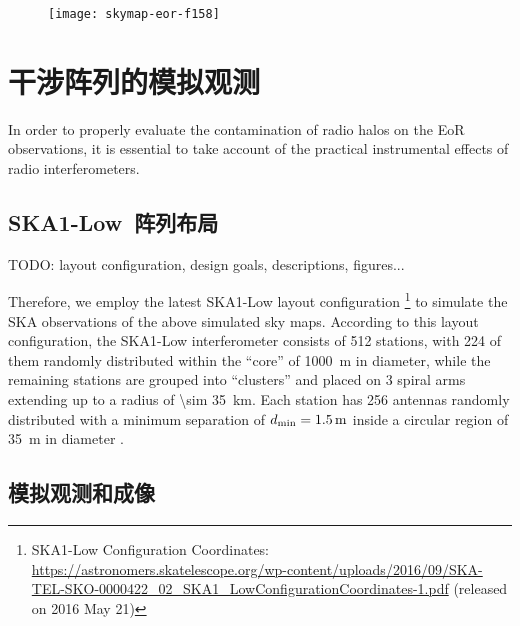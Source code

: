 \begin{figure}[htp]
  \centering
  \texttt{[image: skymap-eor-f158]}
  \label{fig:eor-skymap}
\end{figure}


\section{干涉阵列的模拟观测}
\label{sec:obs-simu}

In order to properly evaluate the contamination of radio halos
on the EoR observations, it is essential to take account of the
practical instrumental effects of radio interferometers.

\subsection{SKA1-Low~阵列布局}

TODO: layout configuration, design goals, descriptions, figures...

Therefore, we employ the latest SKA1-Low layout configuration%
\footnote{\raggedright%
  SKA1-Low Configuration Coordinates:
  \url{https://astronomers.skatelescope.org/wp-content/uploads/2016/09/SKA-TEL-SKO-0000422_02_SKA1_LowConfigurationCoordinates-1.pdf}
  (released on 2016 May 21)
}
to simulate the SKA observations of the above simulated sky maps.
According to this layout configuration,
the SKA1-Low interferometer consists of 512 stations, with 224 of them
randomly distributed within the \enquote{core} of \SI{1000}{\meter} in
diameter, while the remaining stations are grouped into \enquote{clusters}
and placed on 3 spiral arms extending up to a radius of
\SI{\sim 35}{\kilo\meter}.
Each station has 256 antennas randomly distributed with a minimum separation
of $d_{\mathrm{min}} = \SI{1.5}{\meter}$ inside a circular region of
\SI{35}{\meter} in diameter \cite{mort2017}.

\subsection{模拟观测和成像}

